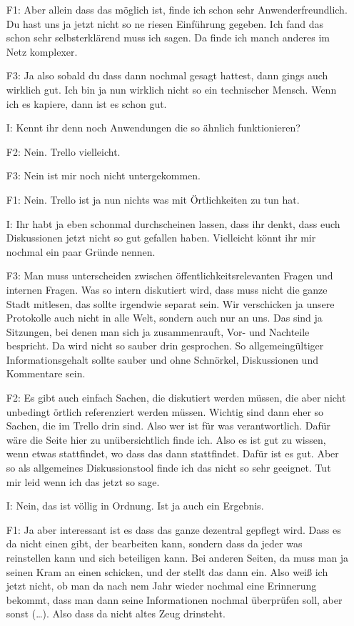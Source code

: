 \begin{itemize}
    \item[F1:] Aber allein dass das möglich ist, finde ich schon sehr Anwenderfreundlich. Du hast uns ja jetzt nicht so ne riesen Einführung gegeben. Ich fand das schon sehr selbsterklärend muss ich sagen. Da finde ich manch anderes im Netz komplexer.
    \item[F3:] Ja also sobald du dass dann nochmal gesagt hattest, dann gings auch wirklich gut. Ich bin ja nun wirklich nicht so ein technischer Mensch. Wenn ich es kapiere, dann ist es schon gut.
    \item[I:] Kennt ihr denn noch Anwendungen die so ähnlich funktionieren?
    \item[F2:] Nein. Trello vielleicht.
    \item[F3:] Nein ist mir noch nicht untergekommen.
    \item[F1:] Nein. Trello ist ja nun nichts was mit {\"O}rtlichkeiten zu tun hat.
    \item[I:] Ihr habt ja eben schonmal durchscheinen lassen, dass ihr denkt, dass euch Diskussionen jetzt nicht so gut gefallen haben. Vielleicht könnt ihr mir nochmal ein paar Gründe nennen.
    \item[F3:] Man muss unterscheiden zwischen öffentlichkeitsrelevanten Fragen und internen Fragen. Was so intern diskutiert wird, dass muss nicht die ganze Stadt mitlesen, das sollte irgendwie separat sein. Wir verschicken ja unsere Protokolle auch nicht in alle Welt, sondern auch nur an uns. Das sind ja Sitzungen, bei denen man sich ja zusammenrauft, Vor- und Nachteile bespricht. Da wird nicht so sauber drin gesprochen. So allgemeingültiger Informationsgehalt sollte sauber und ohne Schnörkel, Diskussionen und Kommentare sein.
    \item[F2:] Es gibt auch einfach Sachen, die diskutiert werden müssen, die aber nicht unbedingt örtlich referenziert werden müssen. Wichtig sind dann eher so Sachen, die im Trello drin sind. Also wer ist für was verantwortlich. Dafür wäre die Seite hier zu unübersichtlich finde ich. Also es ist gut zu wissen, wenn etwas stattfindet, wo dass das dann stattfindet. Dafür ist es gut. Aber so als allgemeines Diskussionstool finde ich das nicht so sehr geeignet. Tut mir leid wenn ich das jetzt so sage.
    \item[I:] Nein, das ist völlig in Ordnung. Ist ja auch ein Ergebnis.
    \item[F1:] Ja aber interessant ist es dass das ganze dezentral gepflegt wird. Dass es da nicht einen gibt, der bearbeiten kann, sondern dass da jeder was reinstellen kann und sich beteiligen kann. Bei anderen Seiten, da muss man ja seinen Kram an einen schicken, und der stellt das dann ein. Also weiß ich jetzt nicht, ob man da nach nem Jahr wieder nochmal eine Erinnerung bekommt, dass man dann seine Informationen nochmal überprüfen soll, aber sonst (\dots). Also dass da nicht altes Zeug drinsteht.

\end{itemize}
